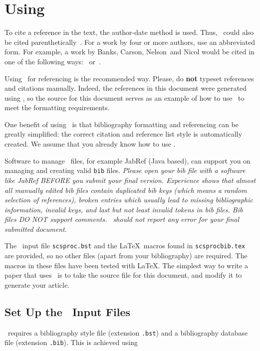 \documentclass{scspaperproc}
\theoremstyle{scsthe}
\begin{document}
\section{Using \BibTeX}
\label{sec:bibtex}
To cite a reference in the text, the author-date method is used. Thus,~ could also be cited parenthetically~\cite{chi89}. For a work by four or more authors, use an abbreviated form. For example, a work by Banks, Carson, Nelson~and Nicol would be cited in one of the following ways:~ or~.

Using \BibTeX\ for referencing is the recommended way. Please, do \textbf{not} typeset references and citations manually. Indeed, the references in this document were generated using \BibTeX, so the source for this document serves as an example of how to use \BibTeX\ to meet the formatting requirements.

One benefit of using \BibTeX\ is that bibliography formatting and referencing can be greatly simplified: the correct citation and reference list style is automatically created. We assume that you already know how to use \BibTeX.

Software to manage \BibTeX\ files, for example JabRef (Java based), can support you on managing and creating valid \texttt{bib} files.
\emph{Please open your bib file with a software like JabRef BEFORE you submit your final version. Experience shows that almost all manually edited bib files contain duplicated bib keys (which means a random selection of references), broken entries which usually lead to missing bibliographic information, invalid keys, and last but not least invalid tokens in bib files. Bib files DO NOT support comments. \BibTeX\ should not report any error for your final submitted document.}

The \BibTeX\ input file \texttt{scsproc.bst} and the \LaTeX\ macros found in \texttt{scsprocbib.tex} are provided, so no other files (apart from your bibliography) are required. The macros in these files have been tested with \LaTeX. The simplest way to write a paper that uses \BibTeX\ is to take the source file for this document, and modify it to generate your article.

\subsection{Set Up the \BibTeX\ Input Files}

\BibTeX\ requires a bibliography style file (extension \texttt{.bst}) and a bibliography database file (extension \texttt{.bib}).  This is achieved using
\end{document}
